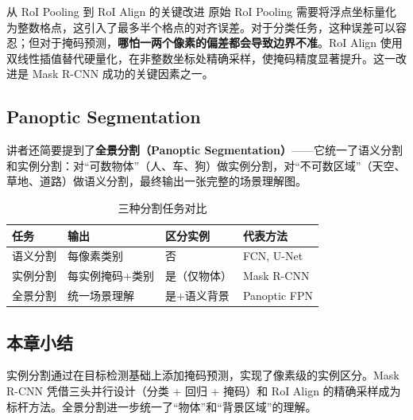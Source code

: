 \begin{knowledgebox}{从 RoI Pooling 到 RoI Align 的关键改进}
原始 RoI Pooling 需要将浮点坐标量化为整数格点，这引入了最多半个格点的对齐误差。对于分类任务，这种误差可以容忍；但对于掩码预测，\textbf{哪怕一两个像素的偏差都会导致边界不准}。RoI Align 使用双线性插值替代硬量化，在非整数坐标处精确采样，使掩码精度显著提升。这一改进是 Mask R-CNN 成功的关键因素之一。
\end{knowledgebox}

\subsection{Panoptic Segmentation}

讲者还简要提到了\textbf{全景分割（Panoptic Segmentation）}——它统一了语义分割和实例分割：对``可数物体''（人、车、狗）做实例分割，对``不可数区域''（天空、草地、道路）做语义分割，最终输出一张完整的场景理解图。

\begin{table}[H]
\centering
\begin{tabular}{p{3cm}p{3.5cm}p{3.5cm}p{3cm}}
\toprule
\textbf{任务} & \textbf{输出} & \textbf{区分实例} & \textbf{代表方法} \\
\midrule
语义分割 & 每像素类别 & 否 & FCN, U-Net \\
实例分割 & 每实例掩码+类别 & 是（仅物体） & Mask R-CNN \\
全景分割 & 统一场景理解 & 是+语义背景 & Panoptic FPN \\
\bottomrule
\end{tabular}
\caption{三种分割任务对比}
\end{table}

\subsection{本章小结}

实例分割通过在目标检测基础上添加掩码预测，实现了像素级的实例区分。Mask R-CNN 凭借三头并行设计（分类 + 回归 + 掩码）和 RoI Align 的精确采样成为标杆方法。全景分割进一步统一了``物体''和``背景区域''的理解。


